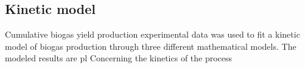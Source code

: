 \subsection{Kinetic model}
Cumulative biogas yield production experimental data was used to fit a kinetic model of biogas production through three different mathematical models. The modeled results are pl
Concerning the kinetics of the process